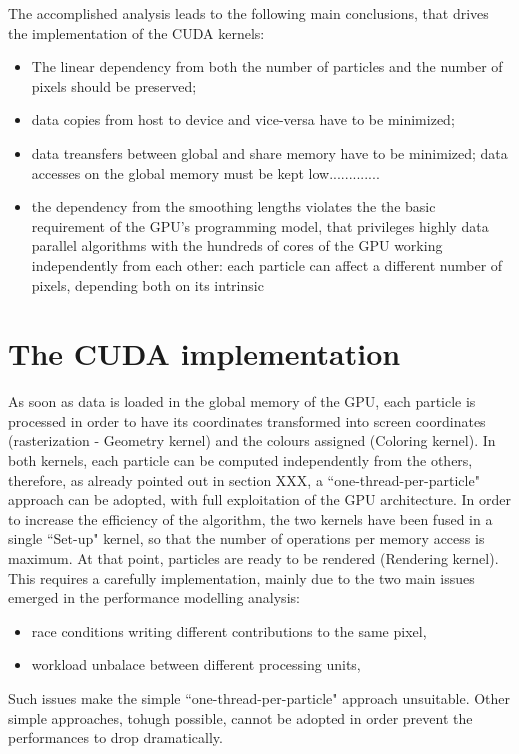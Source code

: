 \documentclass[11pt]{article}
\begin{document}
The accomplished analysis leads to the following main conclusions, that drives 
the implementation of the CUDA kernels:
\begin{itemize}
\item
The linear dependency from both the number of particles and the number of pixels 
should be preserved;
\item
data copies from host to device and vice-versa have to be minimized;
\item
data treansfers between global and share memory have to be minimized; 
data accesses on the global memory must be kept low.............
\item
the dependency from the smoothing lengths violates 
the the basic requirement of the GPU's programming model, that privileges highly data parallel algorithms
with the hundreds of cores of the GPU working independently from each other:
each particle can affect a different number of pixels, depending both on its intrinsic

\end{itemize}




\section{The CUDA implementation}

As soon as data is loaded in the global memory of the GPU, each particle is processed in order to have 
its coordinates transformed into screen coordinates (rasterization - Geometry kernel) 
and the colours assigned (Coloring kernel). In both kernels, each particle can be computed 
independently from the others, therefore, as already pointed out in section XXX, 
a ``one-thread-per-particle" approach can be adopted, with full exploitation of
the GPU architecture. In order to increase the efficiency of the algorithm, the two kernels 
have been fused in a single ``Set-up" kernel, 
so that the number of operations per memory access is maximum. 
At that point, particles are ready to be rendered (Rendering kernel).
This requires a carefully implementation, mainly due to the two main issues emerged 
in the performance modelling analysis:
\begin{itemize}
\item
race conditions writing different contributions to the same pixel,
\item
workload unbalace between different processing units,
\end{itemize}
Such issues make the simple ``one-thread-per-particle" approach unsuitable. Other simple 
approaches, tohugh possible, cannot be adopted in order prevent the performances to drop dramatically.
\end{document}
